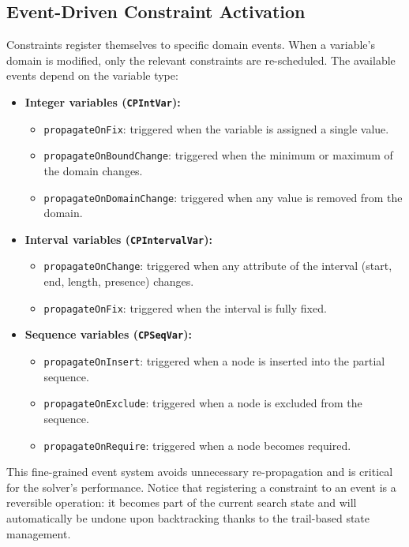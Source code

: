 \documentclass[11pt, a4paper]{scrartcl}
\begin{document}
\subsection{Event-Driven Constraint Activation}

Constraints register themselves to specific domain events. When a variable's domain is modified, only the relevant constraints are re-scheduled. The available events depend on the variable type:

\begin{itemize}
    \item \textbf{Integer variables (\texttt{CPIntVar}):}
    \begin{itemize}
        \item \texttt{propagateOnFix}: triggered when the variable is assigned a single value.
        \item \texttt{propagateOnBoundChange}: triggered when the minimum or maximum of the domain changes.
        \item \texttt{propagateOnDomainChange}: triggered when any value is removed from the domain.
    \end{itemize}
    \item \textbf{Interval variables (\texttt{CPIntervalVar}):}
    \begin{itemize}
        \item \texttt{propagateOnChange}: triggered when any attribute of the interval (start, end, length, presence) changes.
        \item \texttt{propagateOnFix}: triggered when the interval is fully fixed.
    \end{itemize}

    \item \textbf{Sequence variables (\texttt{CPSeqVar}):}
    \begin{itemize}
        \item \texttt{propagateOnInsert}: triggered when a node is inserted into the partial sequence.
        \item \texttt{propagateOnExclude}: triggered when a node is excluded from the sequence.
        \item \texttt{propagateOnRequire}: triggered when a node becomes required.
    \end{itemize}


\end{itemize}

This fine-grained event system avoids unnecessary re-propagation and is critical for the solver's performance.
Notice that registering a constraint to an event is a reversible operation:
it becomes part of the current search state and will automatically be undone upon backtracking thanks to the trail-based state management.
\end{document}
